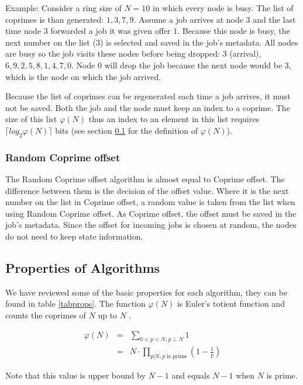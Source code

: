 \documentclass[10pt,a4paper]{article}
\begin{document}
Example:
Consider a ring size of $N=10$ in which every node is busy. The list of coprimes is than generated: ${1, 3, 7, 9}$. Assume a job arrives at node $3$ and the last time node $3$ forwarded a job it was given offer $1$.
Because this node is busy, the next number on the list ($3$) is selected and saved in the job's metadata. All nodes are busy so the job visits these nodes before being dropped: $3$ (arrival), $6, 9, 2, 5, 8, 1, 4, 7, 0$. Node $0$ will drop the job because the next node would be $3$, which is the node on which the job arrived.

Because the list of coprimes can be regenerated each time a job arrives, it must not be saved. Both the job and the node must keep an index to a coprime. The size of this list $\varphi(N)$ thus an index to an element in this list requires $\lceil log_2 \varphi(N) \rceil$ bits (see section \ref{secprops} for the definition of $\varphi(N)$).

\subsubsection*{Random Coprime offset}
The Random Coprime offset algorithm is almost equal to Coprime offset. The difference between them is the decision of the offset value. Where it is the next number on the list in Coprime offset, a random value is taken from the list when using Random Coprime offset. As Coprime offset, the offset must be saved in the job's metadata. Since the offset for incoming jobs is chosen at random, the nodes do not need to keep state information.

\subsection{Properties of Algorithms}
\label{secprops}

We have reviewed some of the basic properties for each algorithm, they can be found in table \ref{tabprops}. The function $\varphi(N)$ is Euler's totient function and counts the coprimes of $N$ up to $N$ \cite{EULER}.

\begin{eqnarray}
\varphi(N) &=& \sum_{0 < p < N, p \perp N} 1 \nonumber \\
&=&  N \cdot \prod_{p|N, p\text{ is prime}} (1-\frac{1}{p}) \nonumber
\end{eqnarray}

Note that this value is upper bound by $N-1$ and equals $N-1$ when $N$ is prime.
\end{document}
